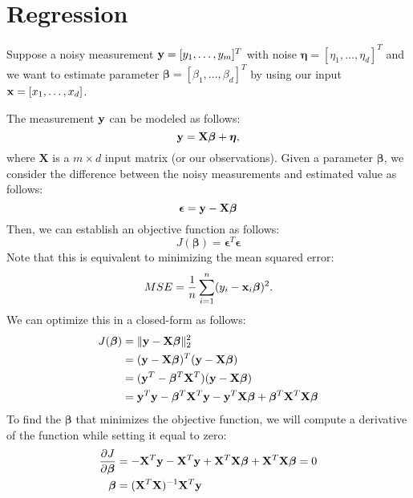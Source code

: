 \chapter{Regression}
\label{sec:basic_regression}
Suppose a noisy measurement ${\mathbf{y}} = [y_1, \dots, y_m]^T$ with noise $\boldsymbol{\eta} = [\eta_1, \dots, \eta_d]^T$ and we want to estimate parameter $\boldsymbol{\beta} = [\beta_1,\dots,\beta_d]^T$ by using our input ${\mathbf{x}} = [x_1, \dots, x_d]$. 

The measurement ${\mathbf{y}}$ can be modeled as follows:
$${\mathbf{y}} = \mathbf{X}\boldsymbol{\beta}+\boldsymbol{\eta},$$
where $\mathbf{X}$ is a $m\times d$ input matrix (or our observations). Given a parameter $\boldsymbol{\beta}$, we consider the difference between the noisy measurements and estimated value as follows:
$$\boldsymbol{\epsilon} = {\mathbf{y}} - \mathbf{X}\boldsymbol{\beta}$$
Then, we can establish an objective function as follows:
$$J(\boldsymbol{\beta}) = \boldsymbol{\epsilon}^T\boldsymbol{\epsilon}$$
Note that this is equivalent to minimizing the mean squared error:
$$MSE = \frac{1}{n}\sum_{i=1}^n (y_i-{\mathbf{x}}_i\boldsymbol{\beta})^2.$$
We can optimize this in a closed-form as follows:
\begin{align*}
	J(\boldsymbol{\beta}) &= \|\mathbf{y}-\mathbf{X}\boldsymbol{\beta}\|^2_2 \\
			&= (\mathbf{y}-\mathbf{X}\boldsymbol{\beta})^T(\mathbf{y}-\mathbf{X}\boldsymbol{\beta})\\
			&= (\mathbf{y}^T-\boldsymbol{\beta}^T\mathbf{X}^T)(\mathbf{y}-\mathbf{X}\boldsymbol{\beta})\\
			&= {\mathbf{y}}^T{\mathbf{y}}-\boldsymbol{\beta}^T\mathbf{X}^T{\mathbf{y}}-{\mathbf{y}}^T\mathbf{X}\boldsymbol{\beta}+\boldsymbol{\beta}^T\mathbf{X}^T\mathbf{X}\boldsymbol{\beta}
\end{align*}
To find the $\boldsymbol{\beta}$ that minimizes the objective function, we will compute a derivative of the function while setting it equal to zero:
\begin{align*}
	\frac{\partial J}{\partial \boldsymbol{\beta}}&= -\mathbf{X}^T{\mathbf{y}}-\mathbf{X}^T{\mathbf{y}}+\mathbf{X}^T\mathbf{X}\boldsymbol{\beta}+\mathbf{X}^T\mathbf{X}\boldsymbol{\beta} = 0\\
	\boldsymbol{\beta}	&= (\mathbf{X}^T\mathbf{X})^{-1}\mathbf{X}^T{\mathbf{y}}
\end{align*}
